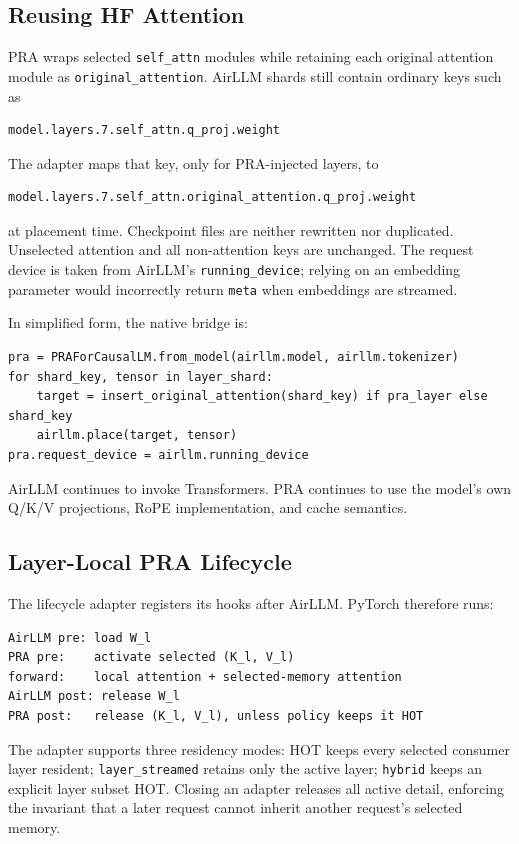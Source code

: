 \documentclass[10pt]{article}
\begin{document}
\subsection{Reusing HF Attention}

PRA wraps selected \texttt{self\_attn} modules while retaining each original
attention module as \texttt{original\_attention}. AirLLM shards still contain
ordinary keys such as
\begin{verbatim}
model.layers.7.self_attn.q_proj.weight
\end{verbatim}
The adapter maps that key, only for PRA-injected layers, to
\begin{verbatim}
model.layers.7.self_attn.original_attention.q_proj.weight
\end{verbatim}
at placement time. Checkpoint files are neither rewritten nor duplicated.
Unselected attention and all non-attention keys are unchanged. The request
device is taken from AirLLM's \texttt{running\_device}; relying on an embedding
parameter would incorrectly return \texttt{meta} when embeddings are streamed.

In simplified form, the native bridge is:
\begin{verbatim}
pra = PRAForCausalLM.from_model(airllm.model, airllm.tokenizer)
for shard_key, tensor in layer_shard:
    target = insert_original_attention(shard_key) if pra_layer else shard_key
    airllm.place(target, tensor)
pra.request_device = airllm.running_device
\end{verbatim}
AirLLM continues to invoke Transformers. PRA continues to use the model's own
Q/K/V projections, RoPE implementation, and cache semantics.

\subsection{Layer-Local PRA Lifecycle}

The lifecycle adapter registers its hooks after AirLLM. PyTorch therefore runs:
\begin{verbatim}
AirLLM pre: load W_l
PRA pre:    activate selected (K_l, V_l)
forward:    local attention + selected-memory attention
AirLLM post: release W_l
PRA post:   release (K_l, V_l), unless policy keeps it HOT
\end{verbatim}
The adapter supports three residency modes: HOT keeps every selected consumer
layer resident; \texttt{layer\_streamed} retains only the active layer;
\texttt{hybrid} keeps an explicit layer subset HOT. Closing an adapter releases
all active detail, enforcing the invariant that a later request cannot inherit
another request's selected memory.
\end{document}
